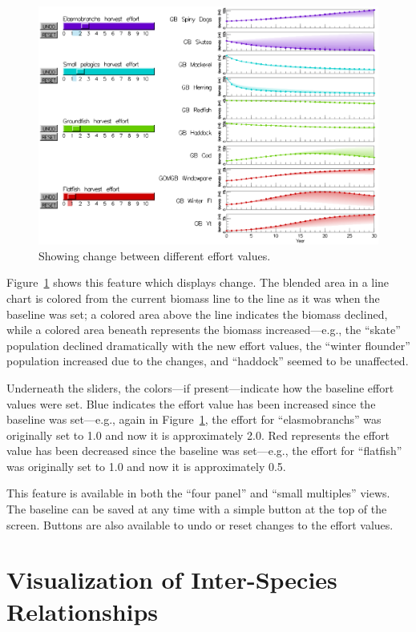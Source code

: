 \begin{figure}[h]
	\centering
	\includegraphics[width=12cm]{figures/eps/msprod_change.eps}
	\caption{Showing change between different effort values.}
	\label{fig:msprod_change}
\end{figure}

Figure~\ref{fig:msprod_change} shows this feature which displays change.  The blended area in a line chart is colored from the current biomass line to the line as it was when the baseline was set; a colored area above the line indicates the biomass declined, while a colored area beneath represents the biomass increased---e.g., the ``skate'' population declined dramatically with the new effort values, the ``winter flounder'' population increased due to the changes, and ``haddock'' seemed to be unaffected.

Underneath the sliders, the colors---if present---indicate how the baseline effort values were set.  Blue indicates the effort value has been increased since the baseline was set---e.g., again in Figure~\ref{fig:msprod_change}, the effort for ``elasmobranchs'' was originally set to 1.0 and now it is approximately 2.0.  Red represents the effort value has been decreased since the baseline was set---e.g., the effort for ``flatfish'' was originally set to 1.0 and now it is approximately 0.5.

This feature is available in both the ``four panel'' and ``small multiples'' views.  The baseline can be saved at any time with a simple button at the top of the screen.  Buttons are also available to undo or reset changes to the effort values.

\section{Visualization of Inter-Species Relationships}

